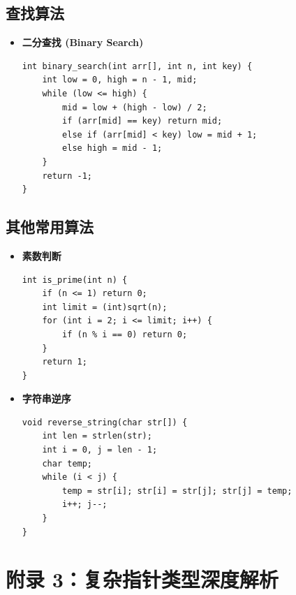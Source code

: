 \documentclass[a4paper,12pt]{article}
\begin{document}
\subsection{查找算法}
\begin{itemize}
    \item \textbf{二分查找 (Binary Search)}
    \begin{lstlisting}
int binary_search(int arr[], int n, int key) {
    int low = 0, high = n - 1, mid;
    while (low <= high) {
        mid = low + (high - low) / 2;
        if (arr[mid] == key) return mid;
        else if (arr[mid] < key) low = mid + 1;
        else high = mid - 1;
    }
    return -1;
}
    \end{lstlisting}
\end{itemize}

\subsection{其他常用算法}
\begin{itemize}
    \item \textbf{素数判断}
    \begin{lstlisting}
int is_prime(int n) {
    if (n <= 1) return 0;
    int limit = (int)sqrt(n);
    for (int i = 2; i <= limit; i++) {
        if (n % i == 0) return 0;
    }
    return 1;
}
    \end{lstlisting}
    \item \textbf{字符串逆序}
    \begin{lstlisting}
void reverse_string(char str[]) {
    int len = strlen(str);
    int i = 0, j = len - 1;
    char temp;
    while (i < j) {
        temp = str[i]; str[i] = str[j]; str[j] = temp;
        i++; j--;
    }
}
    \end{lstlisting}
\end{itemize}

\section{附录 3：复杂指针类型深度解析}
\label{sec:appendix_ptr_types}
\end{document}
